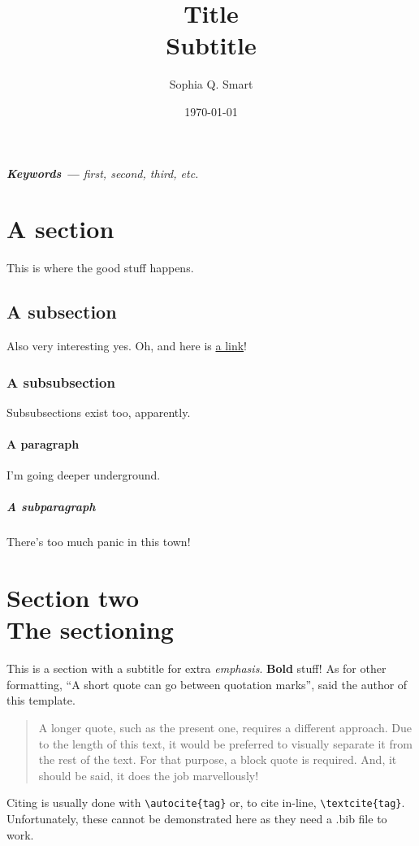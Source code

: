 \documentclass[UKenglish]{article}
\author{Sophia Q. Smart}
\title{\textbf{Title}\\Subtitle}
\date{\today}
\begin{document}
\maketitle

\begin{abstract}

\end{abstract}

\textit{\textbf{\small Keywords --- }\small first, second, third, etc.}

\section{A section}
This is where the good stuff happens.


\subsection{A subsection}
Also very interesting yes.
Oh, and here is \href{https://youtu.be/dQw4w9WgXcQ}{a link}!


\subsubsection{A subsubsection}
Subsubsections exist too, apparently.

\paragraph{A paragraph}
I'm going deeper underground.

\subparagraph{A subparagraph}
There's too much panic in this town!

\section[Section two: the sectioning]{Section two \\ \large{The sectioning}}
This is a section with a subtitle for extra \emph{emphasis}.
\textbf{Bold} stuff!
As for other formatting, ``A short quote can go between quotation marks'', said the author of this template.

\begin{quote}
	A longer quote, such as the present one, requires a different approach.
	Due to the length of this text, it would be preferred to visually separate it from the rest of the text.
	For that purpose, a block quote is required.
	And, it should be said, it does the job marvellously!
\end{quote}

Citing is usually done with \verb|\autocite{tag}| or, to cite in-line, \verb|\textcite{tag}|.
Unfortunately, these cannot be demonstrated here as they need a .bib file to work.

\printbibliography
\end{document}
